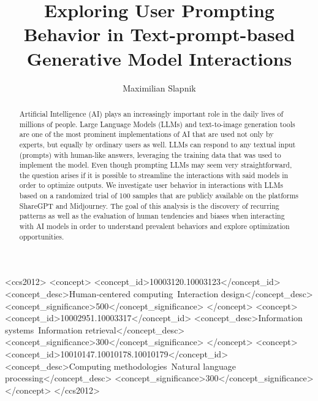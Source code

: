\documentclass[sigconf]{acmart}
\begin{document}
\title[Prompting in Text-prompt-based Generative Model Interactions]{Exploring User
Prompting Behavior in Text-prompt-based Generative Model Interactions}

\author{Maximilian Slapnik}


\begin{abstract}
  \sloppy
  Artificial Intelligence (AI) plays an increasingly important role in the daily lives of
  millions of people.
  Large Language Models (LLMs) and text-to-image generation tools are one of the most prominent
  implementations of AI that are used
  not only by experts, but equally by ordinary users as well.
  LLMs can respond to any textual input (prompts) with human-like answers, leveraging the
  training data that was used to implement the model.
  Even though prompting LLMs may seem very straightforward, the question arises if it is possible
  to streamline the interactions with said models in order to optimize outputs.
  We investigate user behavior in interactions with LLMs based on a randomized trial of 100
  samples that are publicly available on the platforms ShareGPT and Midjourney.
  The goal of this analysis is the discovery of recurring patterns as well as the
  evaluation of human tendencies and biases when interacting with AI models in
  order to understand prevalent behaviors and explore optimization opportunities.
\end{abstract}



\begin{CCSXML}
  <ccs2012>
  <concept>
  <concept_id>10003120.10003123</concept_id>
  <concept_desc>Human-centered computing~Interaction design</concept_desc>
  <concept_significance>500</concept_significance>
  </concept>
  <concept>
  <concept_id>10002951.10003317</concept_id>
  <concept_desc>Information systems~Information retrieval</concept_desc>
  <concept_significance>300</concept_significance>
  </concept>
  <concept>
  <concept_id>10010147.10010178.10010179</concept_id>
  <concept_desc>Computing methodologies~Natural language processing</concept_desc>
  <concept_significance>300</concept_significance>
  </concept>
  </ccs2012>
\end{CCSXML}
\end{document}
